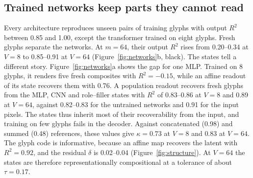 \documentclass[10pt]{article}
\theoremstyle{plain}
\theoremstyle{remark}
\begin{document}
\subsection{Trained networks keep parts they cannot read}
\label{sec:networks}

Every architecture reproduces unseen pairs of training glyphs with output $R^2$ between 0.85 and 1.00, except the transformer trained on eight glyphs. Fresh glyphs separate the networks. At $m = 64$, their output $R^2$ rises from 0.20--0.34 at $V = 8$ to 0.85--0.91 at $V = 64$ (Figure~\ref{fig:networks}b, black). The states tell a different story. Figure~\ref{fig:networks}a shows the gap for one MLP. Trained on 8 glyphs, it renders five fresh composites with $R^2 = -0.15$, while an affine readout of its state recovers them with 0.76. A population readout recovers fresh glyphs from the MLP, CNN and role--filler states with $R^2$ of 0.83--0.86 at $V = 8$ and 0.89 at $V = 64$, against 0.82--0.83 for the untrained networks and 0.91 for the input pixels. The states thus inherit most of their recoverability from the input, and training on few glyphs fails in the decoder. Against concatenated (0.98) and summed (0.48) references, these values give $\kappa = 0.73$ at $V = 8$ and $0.83$ at $V = 64$. The glyph code is informative, because an affine map recovers the latent with $R^2 = 0.92$, and the residual $\delta$ is 0.02--0.04 (Figure~\ref{fig:structure}). At $V = 64$ the states are therefore representationally compositional at a tolerance of about $\tau = 0.17$.
\end{document}

